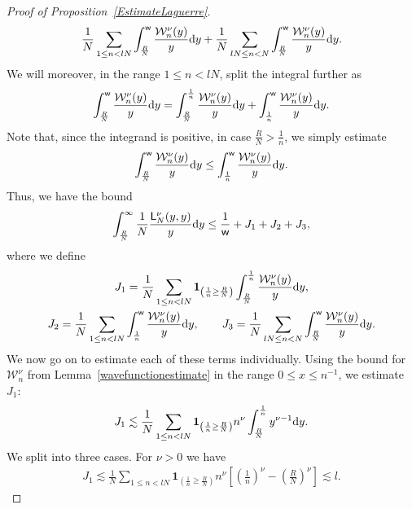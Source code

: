 \begin{proof}[Proof of Proposition~\ref{EstimateLaguerre}]
\begin{gather*}
\frac{1}{N}\sum_{1 \le n < lN}^{} \int_{\frac{R}{N}}^{\mathsf{w}}\frac{\mathcal{W}_n^{\nu}(y)}{y}{\rm d}y+\frac{1}{N}\sum_{l N \le n < N}^{} \int_{\frac{R}{N}}^{\mathsf{w}}\frac{\mathcal{W}_n^{\nu}(y)}{y}{\rm d}y.
\end{gather*}
We will moreover, in the range $1 \le n < l N$, split the integral further as
\begin{gather*}
\int_{\frac{R}{N}}^{\mathsf{w}}\frac{\mathcal{W}_n^{\nu}(y)}{y}{\rm d}y =\int_{\frac{R}{N}}^{\frac{1}{n}}\frac{\mathcal{W}_n^{\nu}(y)}{y}{\rm d}y+\int_{\frac{1}{n}}^{\mathsf{w}}\frac{\mathcal{W}_n^{\nu}(y)}{y}{\rm d}y.
\end{gather*}
Note that, since the integrand is positive, in case $\frac{R}{N}>\frac{1}{n}$, we simply estimate
\begin{gather*}
\int_{\frac{R}{N}}^{\mathsf{w}}\frac{\mathcal{W}_n^{\nu}(y)}{y}{\rm d}y \le \int_{\frac{1}{n}}^{\mathsf{w}}\frac{\mathcal{W}_n^{\nu}(y)}{y}{\rm d}y.
\end{gather*}
Thus, we have the bound
\begin{gather*}
\int_{\frac{R}{N}}^{\infty}\frac{1}{N}\frac{\mathsf{L}_N^{\nu}(y,y)}{y}{\rm d}y \le \frac{1}{\mathsf{w}}+J_1+J_2+J_3,
\end{gather*}
where we define
\begin{gather*}
J_1 = \frac{1}{N}\sum_{1 \le n < lN}^{} \textbf{1}_{\left(\frac{1}{n}\ge \frac{R}{N}\right)} \int_{\frac{R}{N}}^{\frac{1}{n}}\frac{\mathcal{W}_n^{\nu}(y)}{y}{\rm d}y,\\
J_2 = \frac{1}{N}\sum_{1 \le n < lN}^{} \int_{\frac{1}{n}}^{\mathsf{w}}\frac{\mathcal{W}_n^{\nu}(y)}{y}{\rm d}y,\qquad
J_3 = \frac{1}{N}\sum_{l N \le n < N}^{} \int_{\frac{R}{N}}^{\mathsf{w}}\frac{\mathcal{W}_n^{\nu}(y)}{y}{\rm d}y.
\end{gather*}
We now go on to estimate each of these terms individually. Using the bound for $\mathcal{W}_n^{\nu}$ from Lemma~\ref{wavefunctionestimate} in the range $0 \le x \le n^{-1}$, we estimate $J_1$:
\begin{gather*}
J_1 \lesssim \frac{1}{N} \sum_{1 \le n < lN}^{}\textbf{1}_{\left(\frac{1}{n}\ge \frac{R}{N}\right)} n^{\nu} \int_{\frac{R}{N}}^{\frac{1}{n}}y^{\nu-1}{\rm d}y.
\end{gather*}
We split into three cases. For $\nu>0$ we have
\begin{gather*}
J_1 \lesssim \frac{1}{N} \sum_{1 \le n < lN}^{}\textbf{1}_{\left(\frac{1}{n}\ge \frac{R}{N}\right)}n^{\nu} \left[\left(\frac{1}{n}\right)^\nu-\left(\frac{R}{N}\right)^\nu\right]\lesssim l.

\end{gather*}
\end{proof}
